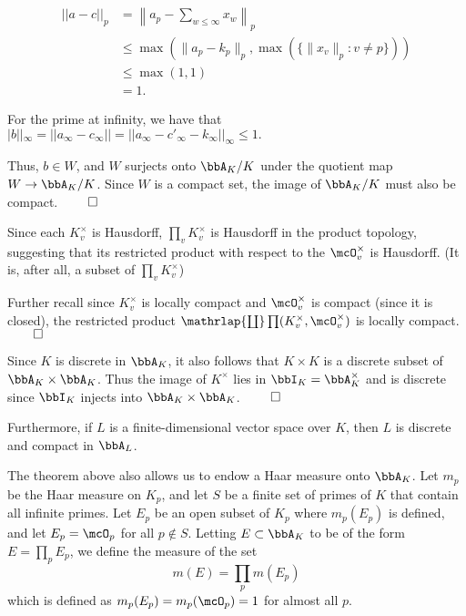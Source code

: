 \documentclass[a4paper, 12pt,oneside,openany]{book}
\begin{document}
\begin{align*}
	||a-c||_p &= \left\| a_p-\sum\limits_{w\leq \infty} x_w\right\|_p \\
	&\leq \max{(\|a_p-k_p\|_p, \max(\{\|x_v\|_p: v\neq p\}))}\\
	&\leq \max(1, 1) \\
	&= 1.
\end{align*}

For the prime at infinity, we have that $|b||_{\infty}=||a_\infty-c_\infty||=||a_\infty-c'_\infty-k_\infty||_{\infty} \leq 1.$ 

Thus, $b \in W$, and $W$ surjects onto $\bbA_K/K$ under the quotient map $W \to \bbA_K/K$. Since $W$ is a compact set, the image of $\bbA_K/K$ must also be compact. $\qed$


 Since each $K_v^\times$ is Hausdorff, $\prod_v K_v^\times$ is Hausdorff in the product topology, suggesting that its restricted product with respect to the $\mcO_v^\times$ is Hausdorff. (It is, after all, a subset of $\prod_v K_v^\times$)

Further recall since $K_v^\times$ is locally compact and $\mcO_v^\times$ is compact (since it is closed), the restricted product $\mathrlap{\coprod}\prod (K_v^\times, \mcO_v^\times)$ is locally compact. $\qed$


 Since $K$ is discrete in $\bbA_K$, it also follows that $K \times K$ is a discrete subset of $\bbA_K \times \bbA_K$. Thus the image of $K^\times$ lies in $\bbI_K=\bbA_K^\times$ and is discrete since $\bbI_K$ injects into $\bbA_K \times \bbA_K$. $\qed$

Furthermore, if $L$ is a finite-dimensional vector space over $K$, then $L$ is discrete and compact in $\bbA_L$.

The theorem above also allows us to endow a Haar measure onto $\bbA_K$. Let $m_p$ be the Haar measure on $K_p$, and let $S$ be a finite set of primes of $K$ that contain all infinite primes. Let $E_p$ be an open subset of $K_p$ where $m_p(E_p)$ is defined, and let $E_p=\mcO_p$ for all $p \not\in S$. Letting $E \subset \bbA_K$ to be of the form $E=\prod\limits_p E_p$, we define the measure of the set $$m(E)=\prod\limits_p m(E_p)$$ which is defined as $m_p(E_p)=m_p(\mcO_p)=1$ for almost all $p$. 

\end{document}
